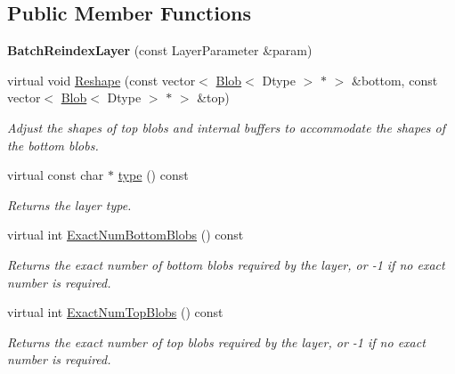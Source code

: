 \subsection*{Public Member Functions}
\begin{DoxyCompactItemize}
\item 
{\bfseries Batch\+Reindex\+Layer} (const Layer\+Parameter \&param)\hypertarget{classcaffe_1_1BatchReindexLayer_a5585d02e701ad89b5ef46ec9340af7b6}{}\label{classcaffe_1_1BatchReindexLayer_a5585d02e701ad89b5ef46ec9340af7b6}

\item 
virtual void \hyperlink{classcaffe_1_1BatchReindexLayer_a4e39964037e5a0b168892b8128a2fef3}{Reshape} (const vector$<$ \hyperlink{classcaffe_1_1Blob}{Blob}$<$ Dtype $>$ $\ast$ $>$ \&bottom, const vector$<$ \hyperlink{classcaffe_1_1Blob}{Blob}$<$ Dtype $>$ $\ast$ $>$ \&top)
\begin{DoxyCompactList}\small\item\em Adjust the shapes of top blobs and internal buffers to accommodate the shapes of the bottom blobs. \end{DoxyCompactList}\item 
virtual const char $\ast$ \hyperlink{classcaffe_1_1BatchReindexLayer_abc303548e6724a91f942b42394b390f2}{type} () const \hypertarget{classcaffe_1_1BatchReindexLayer_abc303548e6724a91f942b42394b390f2}{}\label{classcaffe_1_1BatchReindexLayer_abc303548e6724a91f942b42394b390f2}

\begin{DoxyCompactList}\small\item\em Returns the layer type. \end{DoxyCompactList}\item 
virtual int \hyperlink{classcaffe_1_1BatchReindexLayer_ab84d37975127bfe16593c082731c6f55}{Exact\+Num\+Bottom\+Blobs} () const 
\begin{DoxyCompactList}\small\item\em Returns the exact number of bottom blobs required by the layer, or -\/1 if no exact number is required. \end{DoxyCompactList}\item 
virtual int \hyperlink{classcaffe_1_1BatchReindexLayer_afc9d0ae372b83e2b9e82228893313dc3}{Exact\+Num\+Top\+Blobs} () const 
\begin{DoxyCompactList}\small\item\em Returns the exact number of top blobs required by the layer, or -\/1 if no exact number is required. \end{DoxyCompactList}\end{DoxyCompactItemize}
